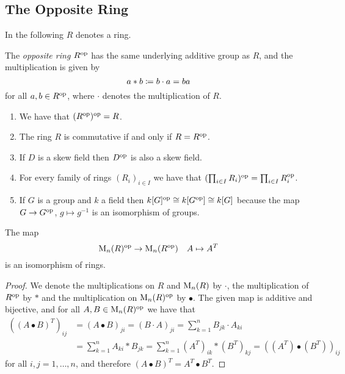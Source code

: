 \subsection{The Opposite Ring}
\label{appendix: the opposite ring}


\begin{conventions}
  In the following $R$ denotes a ring.
\end{conventions}


\begin{definition}
  The \emph{opposite ring} $R^{\mathrm{op}}$ has the same underlying additive group as $R$, and the multiplication is given by
  \[
              a * b
    \coloneqq  b \cdot a
    =         ba
  \]
  for all $a, b \in R^{\mathrm{op}}$, where $\cdot$ denotes the multiplication of $R$.
\end{definition}


\begin{remark}
  \label{remark: basic properties of op}
  \leavevmode
  \begin{enumerate}
    \item
      We have that $( R^{\mathrm{op}} )^{\mathrm{op}} = R$.
    \item
      The ring $R$ is commutative if and only if $R = R^{\mathrm{op}}$.
    \item
      If $D$ is a skew field then $D^{\mathrm{op}}$ is also a skew field.
    \item
      For every family of rings $(R_i)_{i \in I}$ we have that $( \prod_{i \in I} R_i )^{\mathrm{op}} = \prod_{i \in I} R_i^{\mathrm{op}}$.
    \item
      If $G$ is a group and $k$ a field then $k[G]^{\mathrm{op}} \cong k[G^{\mathrm{op}}] \cong k[G]$ because the map $G \to G^{\mathrm{op}}$, $g \mapsto g^{-1}$ is an isomorphism of groups.
  \end{enumerate}
\end{remark}


\begin{lemma}
  \label{lemma: op of matrix rings}
  The map
  \[
            \operatorname{M}_n(R)^{\mathrm{op}}
    \to     \operatorname{M}_n(R^{\mathrm{op}})
    \quad   A
    \mapsto A^T
  \]
  is an isomorphism of rings.
\end{lemma}


\begin{proof}
  We denote the multiplications on $R$ and $\operatorname{M}_n(R)$ by $\cdot$, the multiplication of $R^{\mathrm{op}}$ by $*$ and the multiplication on $\operatorname{M}_n(R)^{\mathrm{op}}$ by $\bullet$.
  The given map is additive and bijective, and for all $A, B \in \operatorname{M}_n(R)^{\mathrm{op}}$ we have that
  \begin{align*}
        \left( (A \bullet B)^T \right)_{ij}
    &=  (A \bullet B)_{ji}
     =  (B \cdot A)_{ji}
     =  \sum_{k=1}^n B_{jk} \cdot A_{ki}  \\
    &=  \sum_{k=1}^n A_{ki} * B_{jk}
     =  \sum_{k=1}^n (A^T)_{ik} * (B^T)_{kj}
     =  \left( (A^T) \bullet (B^T) \right)_{ij}
  \end{align*}
  for all $i, j = 1, \dotsc, n$, and therefore $(A \bullet B)^T = A^T \bullet B^T$.
\end{proof}


